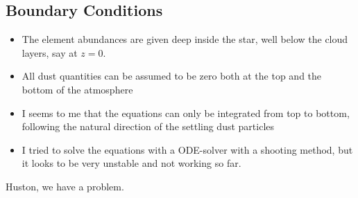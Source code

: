 \documentclass[11pt]{article}
\begin{document}
\subsection{Boundary Conditions}

\begin{itemize}
\item The element abundances are given deep inside the
      star, well below the cloud layers, say at $z=0$.
\item All dust quantities can be assumed to be zero both
      at the top and the bottom of the atmosphere
\item I seems to me that the equations can only be integrated
      from top to bottom, following the natural direction of the
      settling dust particles
\item I tried to solve the equations with a ODE-solver with a 
      shooting method, but it looks to be very unstable and not
      working so far.
\end{itemize}
Huston, we have a problem.



\end{document}
